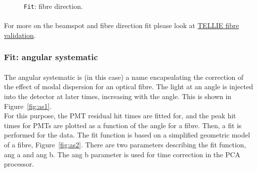 \documentclass[12pt]{article}
\begin{document}
\begin{figure}
\centering
\noindent{}
  \caption{\centering \texttt{Fit}: fibre direction.\hspace{\textwidth}}
  \label{fig:dir}
\end{figure}

\paragraph{}
For more on the beamspot and fibre direction fit please look at \href{http://users.sussex.ac.uk/~mr514/TELLIE_fibre_validation.pdf}{TELLIE fibre validation}.

\subsubsection{Fit: angular systematic}\label{subsub:as}
\paragraph{}
The angular systematic is (in this case) a name encapsulating the correction of the effect of modal dispersion for an optical fibre. The light at an angle is injected into the detector at later times, increasing with the angle. This is shown in Figure~\ref{fig:as1}.\\
For this purpose, the PMT residual hit times are fitted for, and the peak hit times for PMTs are plotted as a function of the angle for a fibre. Then, a fit is performed for the data. The fit function is based on a simplified geometric model of a fibre, Figure~\ref{fig:as2}. There are two parameters describing the fit function, ang a and ang b. The ang b parameter is used for time correction in the PCA processor.
\end{document}
